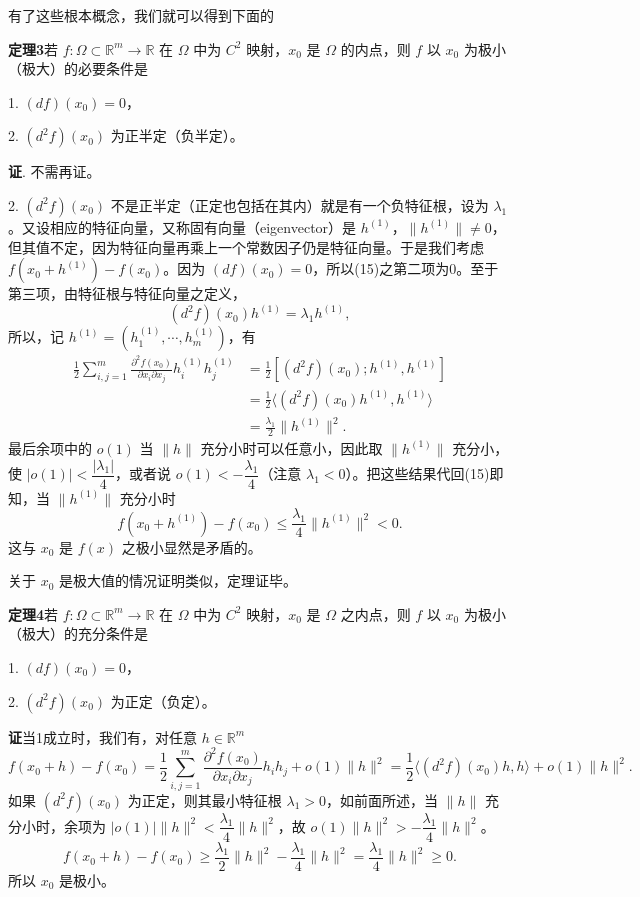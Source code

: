 有了这些根本概念，我们就可以得到下面的

\noindent\textbf{定理3}\quad 若 $f:\Omega\subset\mathbb R^m\to\mathbb R$ 在 $\Omega$ 中为 $C^2$ 映射，$x_0$ 是 $\Omega$ 的内点，则 $f$ 以 $x_0$ 为极小（极大）的必要条件是

1. $(df)(x_0)=0$，

2. $(d^2f)(x_0)$ 为正半定（负半定）。

\noindent\textbf{证}. 不需再证。

2. $(d^2f)(x_0)$ 不是正半定（正定也包括在其内）就是有一个负特征根，设为 $\lambda_1$。又设相应的特征向量，又称固有向量（eigenvector）是 $h^{(1)}$，$\lVert h^{(1)}\rVert\ne0$，但其值不定，因为特征向量再乘上一个常数因子仍是特征向量。于是我们考虑 $f(x_0+h^{(1)})-f(x_0)$。因为 $(df)(x_0)=0$，所以(15)之第二项为0。至于第三项，由特征根与特征向量之定义，
\[
 (d^2f)(x_0)h^{(1)}=\lambda_1h^{(1)},
\]
所以，记 $h^{(1)}=(h_1^{(1)},\cdots,h_m^{(1)})$，有
\begin{align*}
 \frac12\sum_{i,j=1}^m\frac{\partial^2f(x_0)}{\partial x_i\partial x_j}h_i^{(1)}h_j^{(1)}
 &=\frac12[(d^2f)(x_0);h^{(1)},h^{(1)}]\\
 &=\frac12\langle(d^2f)(x_0)h^{(1)},h^{(1)}\rangle\\
 &=\frac{\lambda_1}{2}\lVert h^{(1)}\rVert^2.
\end{align*}
最后余项中的 $o(1)$ 当 $\lVert h\rVert$ 充分小时可以任意小，因此取 $\lVert h^{(1)}\rVert$ 充分小，使 $|o(1)|<\dfrac{|\lambda_1|}{4}$，或者说 $o(1)<-\dfrac{\lambda_1}{4}$（注意 $\lambda_1<0$）。把这些结果代回(15)即知，当 $\lVert h^{(1)}\rVert$ 充分小时
\[
 f(x_0+h^{(1)})-f(x_0)\le\frac{\lambda_1}{4}\lVert h^{(1)}\rVert^2<0.
\]
这与 $x_0$ 是 $f(x)$ 之极小显然是矛盾的。

关于 $x_0$ 是极大值的情况证明类似，定理证毕。

\noindent\textbf{定理4}\quad 若 $f:\Omega\subset\mathbb R^m\to\mathbb R$ 在 $\Omega$ 中为 $C^2$ 映射，$x_0$ 是 $\Omega$ 之内点，则 $f$ 以 $x_0$ 为极小（极大）的充分条件是

1. $(df)(x_0)=0$，

2. $(d^2f)(x_0)$ 为正定（负定）。

\noindent\textbf{证}\quad 当1成立时，我们有，对任意 $h\in\mathbb R^m$
\[
 f(x_0+h)-f(x_0)=\frac12\sum_{i,j=1}^m\frac{\partial^2f(x_0)}{\partial x_i\partial x_j}h_i h_j+o(1)\lVert h\rVert^2
 =\frac12\langle(d^2f)(x_0)h,h\rangle+o(1)\lVert h\rVert^2.
\]
如果 $(d^2f)(x_0)$ 为正定，则其最小特征根 $\lambda_1>0$，如前面所述，当 $\lVert h\rVert$ 充分小时，余项为 $|o(1)|\lVert h\rVert^2<\dfrac{\lambda_1}{4}\lVert h\rVert^2$，故 $o(1)\lVert h\rVert^2>-\dfrac{\lambda_1}{4}\lVert h\rVert^2$。
\[
 f(x_0+h)-f(x_0)\ge\frac{\lambda_1}{2}\lVert h\rVert^2-\frac{\lambda_1}{4}\lVert h\rVert^2
 =\frac{\lambda_1}{4}\lVert h\rVert^2\ge0.
\]
所以 $x_0$ 是极小。

